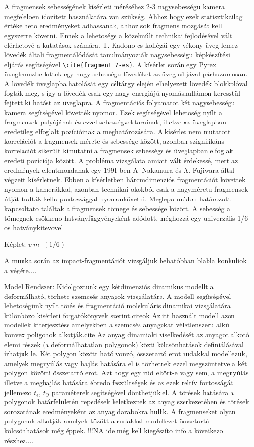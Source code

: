 A fragmensek sebességének kísérleti méréséhez 2-3 nagysebességu kamera megfeleloen idozített használatára 
van szükség. Ahhoz hogy ezek statisztikailag értékelheto eredményeket adhassanak, ahhoz sok fragmens 
mozgását kell egyszerre követni. Ennek a lehetosége a közelmúlt technikai fejlodésével vált
elérhetové a kutatások számára. T. Kadono és kollégái egy vékony üveg lemez lövedék általi fragmentálódását
tanulmányozták nagysebességu képkészítési eljárás segítségével \verb=\cite{fragment 7-es}=. A kísérlet során egy Pyrex
üveglemezbe lottek egy nagy sebességu lövedéket az üveg síkjával párhuzamosan. A lövedék üveglapba hatolását
egy céltárgy elején elhelyezett lövedék blokkolóval fogták meg, s így a lövedék csak egy nagy energiájú 
nyomáshullámon keresztül fejtett ki hatást az üveglapra. A fragmentációs folyamatot két nagysebességu kamera
segítségével követték nyomon. Ezek segítségével lehetoség nyílt a fragmensek pályájának és ezzel sebességvektorainak, 
illetve az üveglapban eredetileg elfoglalt pozícióinak a meghatározására. A kísérlet nem mutatott korrelációt
a fragmensek mérete és sebessége között, azonban szignifikáns korrelációt sikerült kimutatni a fragmensek sebessége
és üveglapban elfoglalt eredeti pozíciója között. A probléma vizsgálata amiatt vált érdekessé, mert az eredmények
ellentmondanak egy 1991-ben A. Nakamura és A. Fujiwara által végzett kísérletnek. Ebben a kísérletben háromdimenziós
fragmentációt követtek nyomon a kamerákkal, azonban technikai okokból csak a nagyméretu fragmensek útját tudták
kello pontossággal nyomonkövetni. Meglepo módon határozott kapcsoltato találtak a fragmensek tömege és sebessége 
között. A sebesség a tömegnek csökkeno hatványfüggvényeként adódott, méghozzá egy univerzális 1/6-os hatványkitevovel

Képlet: $v~m^-(1/6)$

A munka során az impact-fragmentációt vizsgáljuk behatóbban
blabla konkuliok a végére....

Model Rendszer:
Kidolgoztunk egy kétdimenziós dinamikus modellt a deformálható, törheto szemcsés anyagok vizsgálatára. A modell segítségével
lehetoségünk nyílt törés és fragmentáció molekuláris dinamikai vizsgálatára különbözo kisérleti forgatókönyvek szerint.citeok
Az itt használt modell azon modellek kiterjesztése amelyekben a szemcsés anyagokat véletlenszeru alkú konvex poligonok alkotják.cite
Az anyag dinamiaki viselkedését az anyagot alkotó elemi részek (a deformálhatatlan polygonok) közti kölcsönhatások definiálásával írhatjuk
le. Két polygon között ható vonzó, összetartó erot rudakkal modellezük, amelyek megnyúlás vagy hajlás hatására el is törhetnek ezzel
megszüntetve a két polygon közötti összetartó erot. Azt hogy egy rúd eltört-e vagy sem, a megnyúlás illetve a meghajlás hatására ébredo feszültségek
és az ezek reltív fontosságát jellemezo $t_{\epsilon}$, $t_{\Theta}$ paraméterek segítségével dönthetjük el. 
A törések hatására a polygonok határfelületén repedések keletkeznek az anyag szerkezetében és törések sorozatának eredményeként az
anyag darabokra hullik. A fragmenseket olyan polygonok alkotják amelyek között a rudakkal modellezet összetartó kölcsönhatások még 
éppek.
!!!NA ide még kell kiegészíto info a következo részhez....

